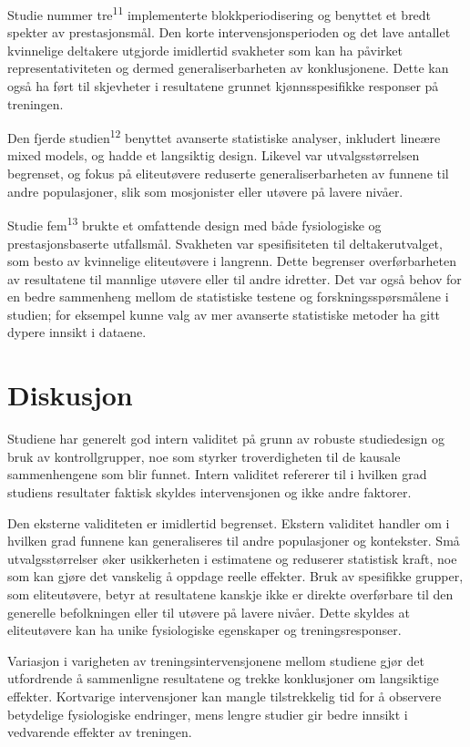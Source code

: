 \documentclass[
  letterpaper,
  DIV=11,
  numbers=noendperiod]{scrreprt}
\begin{document}
Studie nummer tre\textsuperscript{11} implementerte blokkperiodisering
og benyttet et bredt spekter av prestasjonsmål. Den korte
intervensjonsperioden og det lave antallet kvinnelige deltakere utgjorde
imidlertid svakheter som kan ha påvirket representativiteten og dermed
generaliserbarheten av konklusjonene. Dette kan også ha ført til
skjevheter i resultatene grunnet kjønnsspesifikke responser på
treningen.

Den fjerde studien\textsuperscript{12} benyttet avanserte statistiske
analyser, inkludert lineære mixed models, og hadde et langsiktig design.
Likevel var utvalgsstørrelsen begrenset, og fokus på eliteutøvere
reduserte generaliserbarheten av funnene til andre populasjoner, slik
som mosjonister eller utøvere på lavere nivåer.

Studie fem\textsuperscript{13} brukte et omfattende design med både
fysiologiske og prestasjonsbaserte utfallsmål. Svakheten var
spesifisiteten til deltakerutvalget, som besto av kvinnelige
eliteutøvere i langrenn. Dette begrenser overførbarheten av resultatene
til mannlige utøvere eller til andre idretter. Det var også behov for en
bedre sammenheng mellom de statistiske testene og forskningsspørsmålene
i studien; for eksempel kunne valg av mer avanserte statistiske metoder
ha gitt dypere innsikt i dataene.

\section{Diskusjon}\label{diskusjon-4}

Studiene har generelt god intern validitet på grunn av robuste
studiedesign og bruk av kontrollgrupper, noe som styrker troverdigheten
til de kausale sammenhengene som blir funnet. Intern validitet refererer
til i hvilken grad studiens resultater faktisk skyldes intervensjonen og
ikke andre faktorer.

Den eksterne validiteten er imidlertid begrenset. Ekstern validitet
handler om i hvilken grad funnene kan generaliseres til andre
populasjoner og kontekster. Små utvalgsstørrelser øker usikkerheten i
estimatene og reduserer statistisk kraft, noe som kan gjøre det
vanskelig å oppdage reelle effekter. Bruk av spesifikke grupper, som
eliteutøvere, betyr at resultatene kanskje ikke er direkte overførbare
til den generelle befolkningen eller til utøvere på lavere nivåer. Dette
skyldes at eliteutøvere kan ha unike fysiologiske egenskaper og
treningsresponser.

Variasjon i varigheten av treningsintervensjonene mellom studiene gjør
det utfordrende å sammenligne resultatene og trekke konklusjoner om
langsiktige effekter. Kortvarige intervensjoner kan mangle tilstrekkelig
tid for å observere betydelige fysiologiske endringer, mens lengre
studier gir bedre innsikt i vedvarende effekter av treningen.
\end{document}
